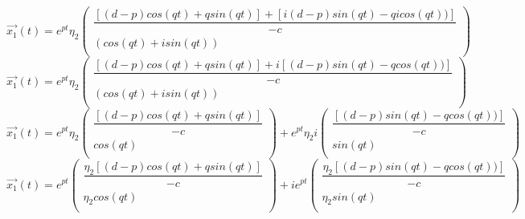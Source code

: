 \documentclass[a4paper]{article}
\begin{document}
    \begin{equation*}
        \vec{x_1}(t)=
        e^{pt}\eta_2
        \begin{pmatrix}
            \dfrac{[(d - p)cos(qt) + q sin(qt)] + [i (d - p) sin(qt) - q i cos(qt) )]}{-c} \\
            (cos(qt) + i sin(qt)) \\
        \end{pmatrix}
    \end{equation*}
    \begin{equation*}
        \vec{x_1}(t)=
        e^{pt}\eta_2
        \begin{pmatrix}
            \dfrac{[(d - p)cos(qt) + q sin(qt)] + i[(d - p) sin(qt) - q cos(qt) )]}{-c} \\
            (cos(qt) + i sin(qt)) \\
        \end{pmatrix}
    \end{equation*}
    \begin{equation*}
        \vec{x_1}(t)=
            e^{pt}\eta_2
            \begin{pmatrix}
                \dfrac{[(d - p)cos(qt) + q sin(qt)]}{-c} \\
                cos(qt) \\
            \end{pmatrix}
            +
            e^{pt}\eta_2 i
            \begin{pmatrix}
                \dfrac{[(d - p) sin(qt) - q cos(qt) )]}{-c} \\
                sin(qt) \\
            \end{pmatrix}
    \end{equation*}
    \begin{equation*}
        \vec{x_1}(t)=
        e^{pt}
        \begin{pmatrix}
            \dfrac{\eta_2[(d - p)cos(qt) + q sin(qt)]}{-c} \\
            \eta_2 cos(qt) \\
        \end{pmatrix}
        +
        i e^{pt}
        \begin{pmatrix}
            \dfrac{\eta_2[(d - p) sin(qt) - q cos(qt) )]}{-c} \\
            \eta_2 sin(qt) \\
        \end{pmatrix}
    \end{equation*}
\end{document}
